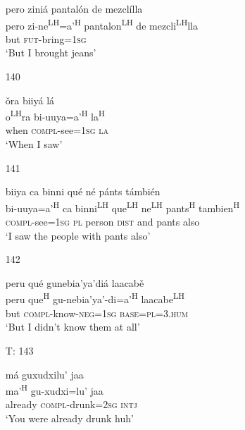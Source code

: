 \begin{itemize}
\glll  pero zini\'{a} pantal\'{o}n de mezcl\'{i}lla \\
pero zi-ne\textsuperscript{LH}=a'\textsuperscript{H} pantalon\textsuperscript{LH} de mezcli\textsuperscript{LH}lla \\
but \textsc{fut}-bring=\textsc{1sg} \\
\glt `But I brought jeans'
 


\item[140]
 
\glll   \v{o}ra biiy\'{a} l\'{a} \\
 o\textsuperscript{LH}ra bi-uuya=a'\textsuperscript{H}  la\textsuperscript{H}  \\
 when \textsc{compl}-see=\textsc{1sg} \textsc{la} \\
\glt `When I saw'
 


\item[141]
 
\glll   biiya ca binni qu\'{e} n\'{e} p\'{a}nts t\'{a}mbi\'{e}n \\
 bi-uuya=a'\textsuperscript{H} ca binni\textsuperscript{LH} que\textsuperscript{LH} ne\textsuperscript{LH} pants\textsuperscript{H} tambien\textsuperscript{H} \\
 \textsc{compl}-see=\textsc{1sg} \textsc{pl} person \textsc{dist} and pants also \\
\glt `I saw the people with pants also'
 


\item[142]
 
\glll   peru qu\'{e} gunebia'ya'di\'{a} laacab\v{e} \\
 peru que\textsuperscript{H} gu-nebia'ya'-di=a'\textsuperscript{H} laacabe\textsuperscript{LH} \\
but \textsc{compl}-know-\textsc{neg}=\textsc{1sg} \textsc{base}=\textsc{pl}=\textsc{3.hum} \\
\glt `But I didn't know them at all'
 


\item[T: 143]
 
\glll  m\'{a} guxudxilu' jaa \\
ma'\textsuperscript{H} gu-xudxi=lu' jaa \\
already \textsc{compl}-drunk=\textsc{2sg} \textsc{intj} \\
\glt `You were already drunk huh'
 



\end{itemize}
